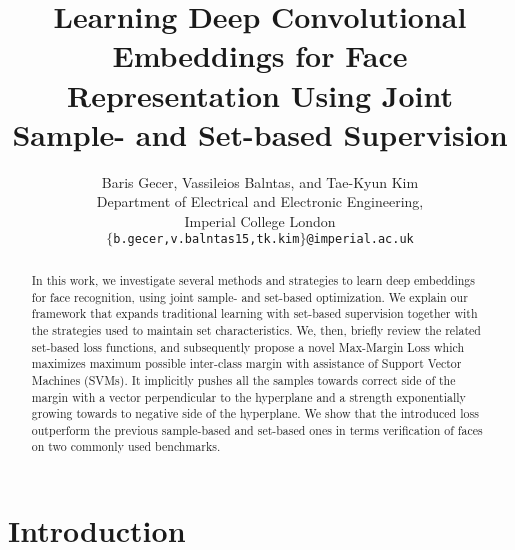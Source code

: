\documentclass[10pt,twocolumn,letterpaper]{article}
\newcommand{\note}[1]{}%
\newcommand{\margin}{Max-Margin Loss\xspace}
\begin{document}
\title{Learning Deep Convolutional Embeddings for Face Representation Using Joint Sample- and Set-based Supervision}

\author{Baris Gecer,  Vassileios Balntas, and  Tae-Kyun Kim\\
Department of Electrical and Electronic Engineering,\\
Imperial College London\\
{\tt\small $\{$b.gecer,v.balntas15,tk.kim$\}$@imperial.ac.uk}
}

\maketitle


\begin{abstract}
   In this work, we investigate several methods and strategies to learn deep embeddings for face recognition, using joint sample- and set-based optimization. We explain our framework that expands traditional learning with set-based supervision together with the strategies used to maintain set characteristics. We, then, briefly review the related set-based loss functions, and subsequently propose a novel \margin which maximizes maximum possible inter-class margin with assistance of Support Vector Machines (SVMs). It implicitly pushes all the samples towards correct side of the margin with a vector perpendicular to the hyperplane and a strength exponentially growing towards to negative side of the hyperplane. We show that the introduced loss outperform the previous sample-based and set-based ones in terms verification of faces on two commonly used benchmarks. 
   
\end{abstract}

\section{Introduction}
\label{sec:intro}
\end{document}
